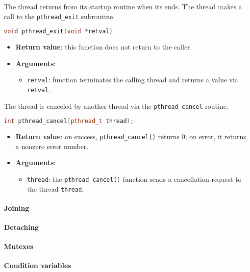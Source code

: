 The thread returns from its startup routine when its  ends. The thread makes a call to the \texttt{pthread\_exit} subroutine.
\begin{definitionbox}
    \begin{lstlisting}[language=c++]
void pthread_exit(void *retval)\end{lstlisting}
\end{definitionbox}
\begin{itemize}
    \item \textbf{Return value}: this function does not return to the caller.
    \item \textbf{Arguments}:
    \begin{itemize}
        \item \texttt{retval}: function terminates the calling thread and returns a value via \texttt{retval}.
    \end{itemize}
\end{itemize}

\highspace
The thread is canceled by another thread via the \texttt{pthread\_cancel} routine.
\begin{definitionbox}
    \begin{lstlisting}[language=c++]
int pthread_cancel(pthread_t thread);\end{lstlisting}
\end{definitionbox}
\begin{itemize}
    \item \textbf{Return value}: on success, \texttt{pthread\_cancel()} returns 0; on error, it returns a nonzero error number.
    \item \textbf{Arguments}:
    \begin{itemize}
        \item \texttt{thread}: the \texttt{pthread\_cancel()} function sends a cancellation request to the thread \texttt{thread}.
    \end{itemize}
\end{itemize}

\longline

\paragraph{Joining}\label{paragraph: Joining}

\paragraph{Detaching}\label{paragraph: Detaching}

\paragraph{Mutexes}\label{paragraph: Mutexes}

\paragraph{Condition variables}\label{paragraph: Condition variables}